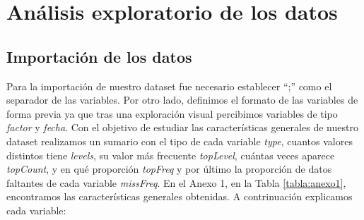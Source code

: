 \documentclass[notspecified,article,submit,moreauthors,pdftex]{Definitions/mdpi}
\begin{document}
\hypertarget{anuxe1lisis-exploratorio-de-los-datos}{%
\section{Análisis exploratorio de los
datos}\label{anuxe1lisis-exploratorio-de-los-datos}}

\hypertarget{importaciuxf3n-de-los-datos}{%
\subsection{Importación de los
datos}\label{importaciuxf3n-de-los-datos}}

Para la importación de nuestro dataset fue necesario establecer ``;''
como el separador de las variables. Por otro lado, definimos el formato
de las variables de forma previa ya que tras una exploración visual
percibimos variables de tipo \emph{factor} y \emph{fecha}. Con el
objetivo de estudiar las características generales de nuestro dataset
realizamos un sumario con el tipo de cada variable \emph{type}, cuantos
valores distintos tiene \emph{levels}, su valor más frecuente
\emph{topLevel}, cuántas veces aparece \emph{topCount}, y en qué
proporción \emph{topFreq} y por último la proporción de datos faltantes
de cada variable \emph{missFreq}. En el Anexo 1, en la Tabla
\ref{tabla:anexo1}, encontramos las características generales obtenidas.
A contrinuación explicamos cada variable:
\end{document}
